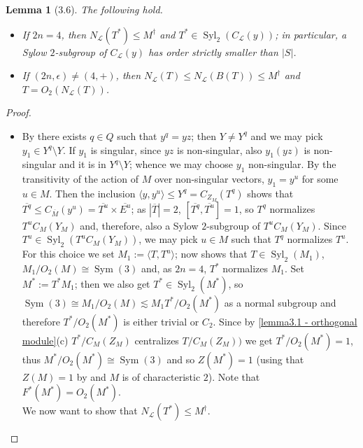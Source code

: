 \documentclass{amsart}
\numberwithin{equation}{section}
\newtheorem{lemma}[equation]{Lemma}
\theoremstyle{definition}
\theoremstyle{subresult}
\theoremstyle{caseresult}
\renewcommand{\L}{\mathcal{L}}
\newcommand{\Syl}{\operatorname{Syl}}
\newcommand{\Sym}{\operatorname{Sym}}
\newcommand{\ov}{\overline}
\newcommand{\<}{\langle}
\renewcommand{\>}{\rangle}
\begin{document}
\begin{lemma}[3.6]\label{lemma3.6}
	The following hold.
	\begin{itemize}
		\item[(a)] If $2n =4$, then $N_\L(T^*) \le M^\dagger$ and $T^* \in \Syl_2(C_\L(y))$; in particular, a Sylow $2$-subgroup of $C_\L(y)$ has order strictly smaller than $|S|$.
		\item[(b)] If $(2n,\epsilon) \ne (4,+)$, then $N_\L(T) \le N_\L(B(T)) \le M^\dagger$ and $T=O_2(N_{\L}(T))$.
	\end{itemize}
\end{lemma}
\begin{proof}
	\begin{itemize}
		\item[(a)] By \cite[Lemma 3.4(a)]{Meier-Stell-Stroth:2012} there exists $q \in Q$ such that $y^q=yz$; then $Y \ne Y^q$ and we may pick $y_1 \in Y^q \setminus Y$. If $y_1$ is singular, since $yz$ is non-singular, also $y_1(yz)$ is non-singular and it is in $Y^q \setminus Y$; whence we may choose $y_1$ non-singular. By the transitivity of the action of $M$ over non-singular vectors, $y_1=y^u$ for some $u \in M$. Then the inclusion $\<y,y^u\> \le Y^q = C_{Z_M}(T^q)$ shows that $\ov{T^q} \le C_{\ov{M}}(y^u) = \ov{T^u} \times \ov{E^u}$; as $|\ov{T}|=2$, $[\ov{T^q},\ov{T^u}]=1$, so $T^q$ normalizes $T^uC_M(Y_M)$ and, therefore, also a Sylow $2$-subgroup of $T^uC_M(Y_M)$. Since $T^u \in \Syl_2(T^uC_M(Y_M))$, we may pick $u \in M$ such that $T^q$ normalizes $T^u$. For this choice we set $M_1:= \<T,T^u\>$; \cite[Lemma 3.4(h)]{Meier-Stell-Stroth:2012} now shows that $T \in \Syl_2(M_1)$, $M_1/O_2(M) \cong \Sym(3)$ and, as $2n=4$, $T^*$ normalizes $M_1$. Set $M^* := T^* M_1$; then we also get $T^* \in \Syl_2(M^*)$, so $\Sym(3) \cong M_1 / O_2(M) \lesssim M_1 T^* / O_2(M^*)$ as a normal subgroup and therefore $T^*/O_2(M^*)$ is either trivial or $C_2$. Since by \ref{lemma3.1 - orthogonal module}(c) $T^*/C_M(Z_M)$ centralizes $T/C_M(Z_M))$ we get $T^*/O_2(M^*)=1$, thus $M^* / O_2(M^*) \cong  \Sym(3)$ and so $Z(M^*)=1$ (using that $Z(M)=1$ by \cite[Lemma 3.3(a)]{Meier-Stell-Stroth:2012} and $M$ is of characteristic $2$). Note that $F^*(M^*)=O_2(M^*)$.\\
        We now want to show that $N_\L(T^*) \le M^\dagger$.\\
		

\end{itemize}
\end{proof}
\end{document}
